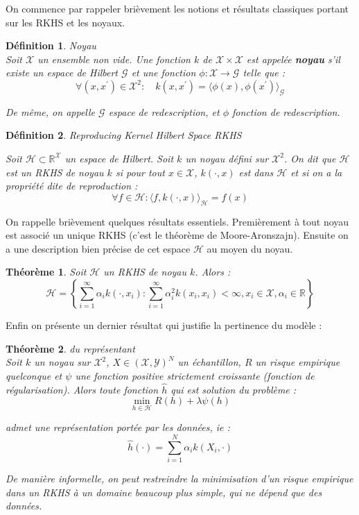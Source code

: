 \documentclass[10pt,a4paper]{article}
\newtheorem{definition}{Définition}
\newtheorem{theoreme}{Théorème}
\begin{document}
On commence par rappeler brièvement les notions et résultats classiques portant sur les RKHS et les noyaux.\cite{svm}

\begin{definition}{Noyau}\\
Soit $\mathcal{X}$ un ensemble non vide.
Une fonction $k$ de $\mathcal{X} \times \mathcal{X}$ est appelée \textbf{noyau} s'il existe un espace de Hilbert $\mathcal{G}$ et une fonction $\phi : \mathcal{X} \rightarrow \mathcal{G}$ telle que :
\[
\forall (x, x^{'}) \in \mathcal{X}^2 : \quad k(x, x^{'} ) = \langle \phi(x), \phi(x^{'}) \rangle_{\mathcal{G}}
\]

De même, on appelle $\mathcal{G}$ espace de redescription, et $\phi$ fonction de redescription.
\end{definition}

\begin{definition}{Reproducing Kernel Hilbert Space RKHS}

Soit $\mathcal{H} \subset \mathbb{R}^\mathcal{X}$ un espace de Hilbert. Soit $k$ un noyau défini sur $\mathcal{X}^2$. On dit que $\mathcal{H}$ est un RKHS de noyau $k$ si pour tout $x \in \mathcal{X}$, $k(\cdot, x)$ est dans $\mathcal{H}$ et si on a la propriété dite de reproduction :
\[ \forall f \in \mathcal{H} : \langle f , k(\cdot, x) \rangle_{\mathcal{H}} = f(x) \]
\end{definition}

On rappelle brièvement quelques résultats essentiels. Premièrement à tout noyau est associé un unique RKHS (c'est le théorème de Moore-Aronszajn). Ensuite on a une description bien précise de cet espace $\mathcal{H}$ au moyen du noyau.

\begin{theoreme}
Soit $\mathcal{H}$ un RKHS de noyau $k$.
Alors :
\[ \mathcal{H} = \left\{ \sum_{i=1}^{\infty} \alpha_i k(\cdot, x_i ) : \sum_{i=1}^{\infty} \alpha_{i}^2 k(x_i, x_i) < \infty, x_i \in \mathcal{X}, \alpha_i \in \mathbb{R} \right\}
\]
\end{theoreme}

Enfin on présente un dernier résultat qui justifie la pertinence du modèle : 

\begin{theoreme}{du représentant} \\
Soit $k$ un noyau sur $\mathcal{X}^2$, $X \in (\mathcal{X}, \mathcal{Y})^N$ un échantillon, $R$ un risque empirique quelconque et $\psi$ une fonction positive strictement croissante (fonction de régularisation).
Alors toute fonction $\hat{h}$ qui est solution du problème :
\[ \min_{h \in \mathcal{H}} R(h) + \lambda \psi(h) \]

admet une représentation portée par les données, \textit{ie} :
\[ \hat{h}(\cdot) = \sum_{i=1}^{N} \alpha_i k(X_i, \cdot) \]

De manière informelle, on peut restreindre la minimisation d'un risque empirique dans un RKHS à un domaine beaucoup plus simple, qui ne dépend que des données.
\end{theoreme}
\end{document}
